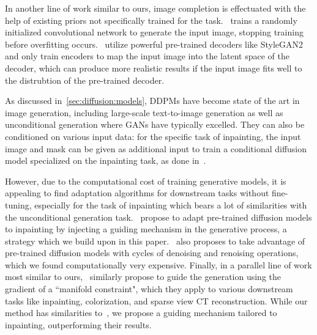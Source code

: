 
In another line of work similar to ours, image completion is effectuated with the 
help of existing priors not specifically trained for the task.~\cite{ulyanov2018deep} 
trains a randomly initialized convolutional network to generate the input image, 
stopping training before overfitting occurs.~\cite{psp, zhao2021comodgan, glean} 
utilize powerful pre-trained decoders like StyleGAN2~\citep{karra2020stylegan2} and only train
 encoders to map the input image into the latent space of the decoder, which can produce
  more realistic results if the input image fits well to the distrubtion of the
   pre-trained decoder. 






As discussed in~\ref{sec:diffusion:models}, \ac{DDPM}s have become state of the art in 
image generation, including large-scale text-to-image generation as well as unconditional generation 
where \ac{GAN}s have typically excelled. They can also be conditioned
 on various input data: for the specific task of inpainting, the input image and mask 
 can be given as additional input to train a conditional diffusion model specialized on
  the inpainting task, as done in~\cite{saharia2022palette}.

However, due to the computational cost of training generative models, it is appealing 
to find adaptation algorithms for downstream tasks without fine-tuning, especially for
the task of inpainting which bears a lot of similarities with the unconditional 
generation task.~\cite{rombach2022high, nichol2021glide, song2021scorebased} propose to adapt
pre-trained diffusion models to inpainting by injecting a guiding mechanism in the 
generative process, a strategy which we build upon in this paper.~\cite{lugmayr2022repaint} also
proposes to take advantage of pre-trained diffusion models with cycles of denoising 
and renoising operations, which we found computationally very expensive. Finally, 
in a parallel line of work most similar to ours,~\cite{mcg} similarly propose to
guide the generation using the gradient of a ``manifold constraint", which they apply to 
various downstream tasks like inpainting, colorization, and sparse view CT reconstruction. 
While our method has similarities to~\cite{mcg}, we propose a guiding mechanism tailored to 
inpainting, outperforming their results.


